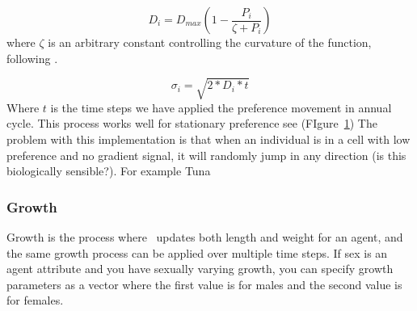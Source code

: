 \begin{equation}
D_i = D_{max}\left(1 - \frac{P_i}{\zeta + P_i}\right)
\end{equation}
%
where $\zeta$ is an arbitrary constant controlling the curvature of the function, following \cite{Bertignac1998}.

\begin{equation}
\sigma_i = \sqrt{2 * D_i * t}
\end{equation}
%
Where $t$ is the time steps we have applied the preference movement in annual cycle. This process works well for stationary preference see (FIgure~\ref{fig:static_pref}) The problem with this implementation is that when an individual is in a cell with low preference and no gradient signal, it will randomly jump in any direction (is this biologically sensible?). For example Tuna

\begin{figure}[htp]\label{fig:pref}%
	\centering
	\qquad
	\label{fig:static_pref}%
\end{figure}




\subsubsection{Growth}\label{sec:age-at-age}
Growth is the process where \IBM\ updates both length and weight for an agent, and the same growth process can be applied over multiple time steps. If sex is an agent attribute and you have sexually varying growth, you can specify growth parameters as a vector where the first value is for males and the second value is for females.
